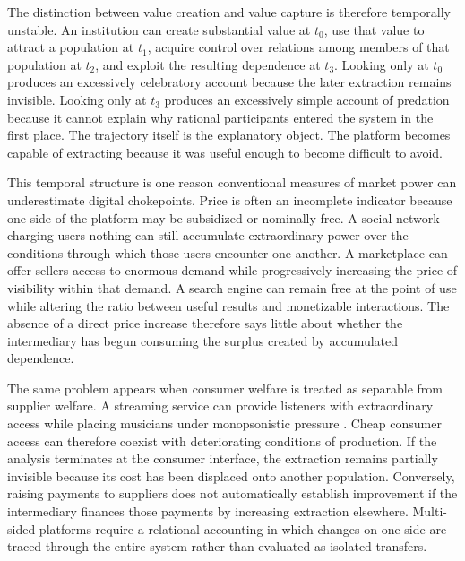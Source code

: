 \documentclass[11pt]{article}
\begin{document}
The distinction between value creation and value capture is therefore temporally unstable. An institution can create substantial value at \(t_0\), use that value to attract a population at \(t_1\), acquire control over relations among members of that population at \(t_2\), and exploit the resulting dependence at \(t_3\). Looking only at \(t_0\) produces an excessively celebratory account because the later extraction remains invisible. Looking only at \(t_3\) produces an excessively simple account of predation because it cannot explain why rational participants entered the system in the first place. The trajectory itself is the explanatory object. The platform becomes capable of extracting because it was useful enough to become difficult to avoid.

This temporal structure is one reason conventional measures of market power can underestimate digital chokepoints. Price is often an incomplete indicator because one side of the platform may be subsidized or nominally free. A social network charging users nothing can still accumulate extraordinary power over the conditions through which those users encounter one another. A marketplace can offer sellers access to enormous demand while progressively increasing the price of visibility within that demand. A search engine can remain free at the point of use while altering the ratio between useful results and monetizable interactions. The absence of a direct price increase therefore says little about whether the intermediary has begun consuming the surplus created by accumulated dependence.

The same problem appears when consumer welfare is treated as separable from supplier welfare. A streaming service can provide listeners with extraordinary access while placing musicians under monopsonistic pressure \parencite{eriksson2019spotify,prey2020musicians,hesmondhalgh2019cultural}. Cheap consumer access can therefore coexist with deteriorating conditions of production. If the analysis terminates at the consumer interface, the extraction remains partially invisible because its cost has been displaced onto another population. Conversely, raising payments to suppliers does not automatically establish improvement if the intermediary finances those payments by increasing extraction elsewhere. Multi-sided platforms require a relational accounting in which changes on one side are traced through the entire system rather than evaluated as isolated transfers.
\end{document}
